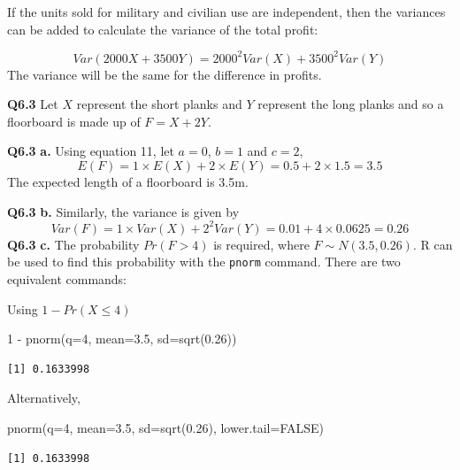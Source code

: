 \documentclass[
  oneside]{krantz}
\newenvironment{Shaded}{\begin{snugshade}}{\end{snugshade}}
\newcommand{\AttributeTok}[1]{\textcolor[rgb]{0.77,0.63,0.00}{#1}}
\newcommand{\ConstantTok}[1]{\textcolor[rgb]{0.00,0.00,0.00}{#1}}
\newcommand{\DecValTok}[1]{\textcolor[rgb]{0.00,0.00,0.81}{#1}}
\newcommand{\FloatTok}[1]{\textcolor[rgb]{0.00,0.00,0.81}{#1}}
\newcommand{\FunctionTok}[1]{\textcolor[rgb]{0.00,0.00,0.00}{#1}}
\newcommand{\NormalTok}[1]{#1}
\newcommand{\SpecialCharTok}[1]{\textcolor[rgb]{0.00,0.00,0.00}{#1}}
\begin{document}
If the units sold for military and civilian use are independent, then the variances can be added to calculate the variance of the total profit:

\[Var(2000X + 3500Y) = 2000^2Var(X) + 3500^2Var(Y)\]
The variance will be the same for the difference in profits.

\textbf{Q6.3} Let \(X\) represent the short planks and \(Y\) represent the long planks and so a floorboard is made up of \(F = X + 2Y\).

\textbf{Q6.3} \textbf{a.} Using equation 11, let \(a=0\), \(b=1\) and \(c=2\),
\[E(F) = 1 \times E(X) + 2 \times E(Y) = 0.5 + 2 \times 1.5 = 3.5\]
The expected length of a floorboard is 3.5m.

\textbf{Q6.3} \textbf{b.} Similarly, the variance is given by
\[Var(F) = 1 \times Var(X) + 2^2Var(Y) = 0.01 + 4 \times 0.0625 = 0.26\]
\textbf{Q6.3} \textbf{c.} The probability \(Pr(F > 4)\) is required, where \(F \sim N(3.5, 0.26)\). R can be used to find this probability with the \texttt{pnorm} command. There are two equivalent commands:

Using \(1 - Pr(X \le 4)\)

\begin{Shaded}
\begin{Highlighting}[]
\DecValTok{1} \SpecialCharTok{{-}} \FunctionTok{pnorm}\NormalTok{(}\AttributeTok{q=}\DecValTok{4}\NormalTok{, }\AttributeTok{mean=}\FloatTok{3.5}\NormalTok{, }\AttributeTok{sd=}\FunctionTok{sqrt}\NormalTok{(}\FloatTok{0.26}\NormalTok{))}
\end{Highlighting}
\end{Shaded}

\begin{verbatim}
[1] 0.1633998
\end{verbatim}

Alternatively,

\begin{Shaded}
\begin{Highlighting}[]
\FunctionTok{pnorm}\NormalTok{(}\AttributeTok{q=}\DecValTok{4}\NormalTok{, }\AttributeTok{mean=}\FloatTok{3.5}\NormalTok{, }\AttributeTok{sd=}\FunctionTok{sqrt}\NormalTok{(}\FloatTok{0.26}\NormalTok{), }\AttributeTok{lower.tail=}\ConstantTok{FALSE}\NormalTok{)}
\end{Highlighting}
\end{Shaded}

\begin{verbatim}
[1] 0.1633998
\end{verbatim}
\end{document}
